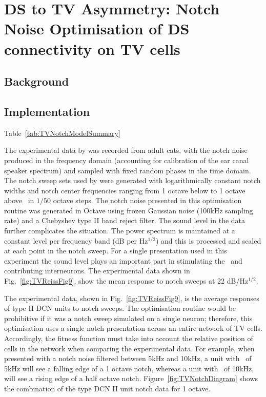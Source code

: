

\section[TV to DS Asymmetry]{DS to TV Asymmetry: Notch Noise Optimisation of DS connectivity on TV cells} \label{sec:TV-cell-model}

\subsection{Background}


\subsection{Implementation}

Table~\ref{tab:TVNotchModelSummary} 

The experimental data by \citet{ReissYoung:2005} was recorded from adult cats, with the notch noise produced in the frequency domain (accounting for calibration of the ear canal speaker spectrum) and sampled with fixed random phases in the time domain.
The notch sweep sets used by \citeauthor{ReissYoung:2005} were generated with logarithmically constant notch widths and notch center frequencies ranging from 1 octave below to 1 octave above \BF~in $1/50$ octave steps.
The notch noise presented in this optimisation routine was generated in Octave using frozen Gaussian noise (100kHz sampling rate) and a Chebyshev type II band reject filter.
The sound level in the \citet{ReissYoung:2005} data further complicates the situation.
The power spectrum is maintained at a constant level per frequency band (dB per Hz$^{1/2}$) and this is processed and scaled at each point in the notch sweep.
For a single presentation used in this experiment the sound level plays an important part in stimulating the \ANFs~and contributing interneurons.
The experimental data shown in Fig.~\ref{fig:TVReissFig9}, show the mean response to notch sweeps at 22 dB/Hz$^{1/2}$.


The experimental data, shown in Fig.~\ref{fig:TVReissFig9}, is the average responses of type II DCN units to notch sweeps.
The optimisation routine would be prohibitive if it was a notch sweep simulated on a single neuron; therefore, this optimisation uses a single notch presentation across an entire network of TV cells.
Accordingly, the fitness function must take into account the relative position of cells in the network when comparing the experimental data.
For example, when presented with a notch noise filtered between 5kHz and 10kHz, a unit with \CF~of 5kHz will see a falling edge of a 1 octave notch, whereas a unit with \CF~of 10kHz, will see a rising edge of a half octave notch.
Figure~\ref{fig:TVNotchDiagram} shows the combination of the type DCN II unit notch data for 1 octave.

